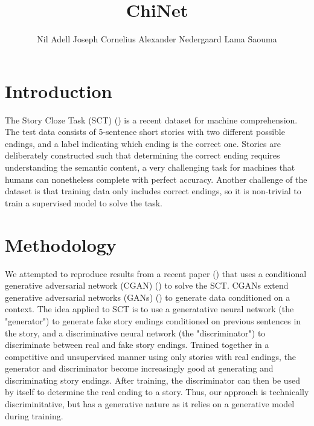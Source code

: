 \documentclass{article}
\title{ChiNet}
\author{Nil Adell \qquad Joseph Cornelius \qquad Alexander Nedergaard \qquad Lama Saouma}
\begin{document}

\maketitle


\section{Introduction}
The Story Cloze Task (SCT) (\cite{2016arXiv160401696M}) is a recent dataset for machine comprehension. The test data consists of 5-sentence short stories with two different possible endings, and a label indicating which ending is the correct one. Stories are deliberately constructed such that determining the correct ending requires understanding the semantic content, a very challenging task for machines that humans can nonetheless complete with perfect accuracy. Another challenge of the dataset is that training data only includes correct endings, so it is non-trivial to train a supervised model to solve the task.
\section{Methodology}
We attempted to reproduce results from a recent paper (\cite{ijcai2017-576}) that uses a conditional generative adversarial network (CGAN) (\cite{2014arXiv1411.1784M}) to solve the SCT. CGANs extend generative adversarial networks (GANs) (\cite{2014arXiv1406.2661G}) to generate data conditioned on a context. The idea applied to SCT is to use a generatative neural network (the "generator") to generate fake story endings conditioned on previous sentences in the story, and a discriminative neural network (the "discriminator") to discriminate between real and fake story endings. Trained together in a competitive and unsupervised manner using only stories with real endings, the generator and discriminator become increasingly good at generating and discriminating story endings. After training, the discriminator can then be used by itself to determine the real ending to a story. Thus, our approach is technically discriminitative, but has a generative nature as it relies on a generative model during training.
\end{document}
